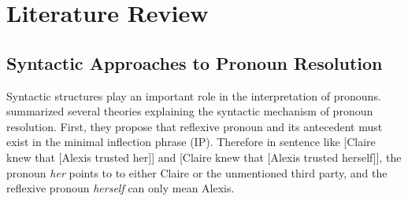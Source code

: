 \chapter{Literature Review}

\section{Syntactic Approaches to Pronoun Resolution}
Syntactic structures play an important role in the interpretation of pronouns. \citet{ogrady2010} summarized several theories explaining the syntactic mechanism of pronoun resolution. First, they propose that reflexive pronoun and its antecedent must exist in the minimal inflection phrase (IP). Therefore in sentence like [Claire knew that [Alexis trusted her]] and [Claire knew that [Alexis trusted herself]], the pronoun \emph{her} points to to either Claire or the unmentioned third party, and the reflexive pronoun \emph{herself} can only mean Alexis.

